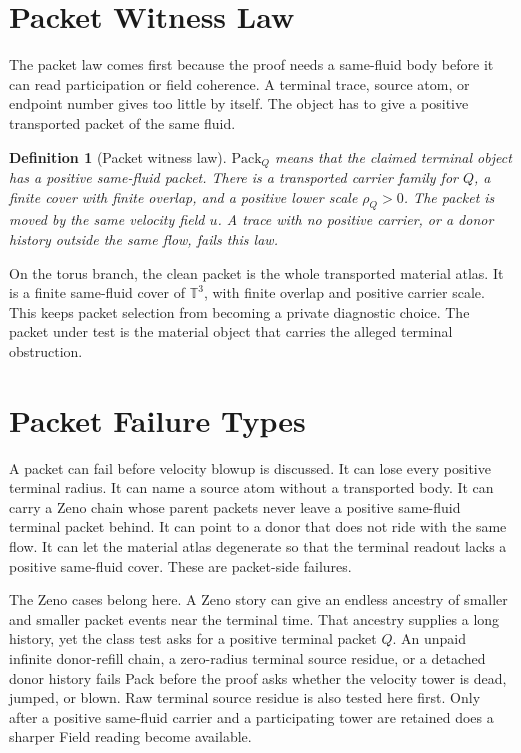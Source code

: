 \documentclass[11pt]{article}
\newtheorem{definition}{Definition}
\newcommand{\Pack}{\mathrm{Pack}}
\begin{document}
\section{Packet Witness Law}

The packet law comes first because the proof needs a same-fluid body before it can read participation or field coherence.
A terminal trace, source atom, or endpoint number gives too little by itself.
The object has to give a positive transported packet of the same fluid.

\begin{definition}[Packet witness law]
\(\Pack_Q\) means that the claimed terminal object has a positive same-fluid packet.
There is a transported carrier family for \(Q\), a finite cover with finite overlap, and a positive lower scale \(\rho_Q>0\).
The packet is moved by the same velocity field \(u\).
A trace with no positive carrier, or a donor history outside the same flow, fails this law.
\end{definition}

On the torus branch, the clean packet is the whole transported material atlas.
It is a finite same-fluid cover of \(\mathbb T^3\), with finite overlap and positive carrier scale.
This keeps packet selection from becoming a private diagnostic choice.
The packet under test is the material object that carries the alleged terminal obstruction.

\section{Packet Failure Types}

A packet can fail before velocity blowup is discussed.
It can lose every positive terminal radius.
It can name a source atom without a transported body.
It can carry a Zeno chain whose parent packets never leave a positive same-fluid terminal packet behind.
It can point to a donor that does not ride with the same flow.
It can let the material atlas degenerate so that the terminal readout lacks a positive same-fluid cover.
These are packet-side failures.

The Zeno cases belong here.
A Zeno story can give an endless ancestry of smaller and smaller packet events near the terminal time.
That ancestry supplies a long history, yet the class test asks for a positive terminal packet \(Q\).
An unpaid infinite donor-refill chain, a zero-radius terminal source residue, or a detached donor history fails Pack before the proof asks whether the velocity tower is dead, jumped, or blown.
Raw terminal source residue is also tested here first.
Only after a positive same-fluid carrier and a participating tower are retained does a sharper Field reading become available.
\end{document}
